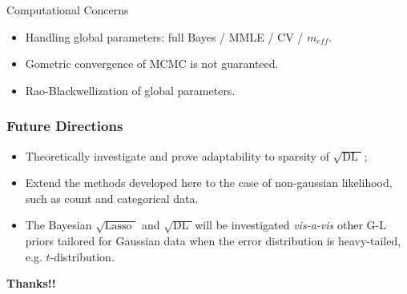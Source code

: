 \documentclass[10pt]{beamer}
\theoremstyle{plain}
\def\heading#1{\begin{center} \Large\bf{\color{DarkBlue} #1}
\end{center} } %
\def\sql{$\sqrt{\text{Lasso }}$}
\def\sqdl{$\sqrt{\text{DL }}$}
\begin{document}
\begin{frame}{Computational Concerns}
\begin{itemize}
	\item Handling global parameters: full Bayes / MMLE / CV / $m_{eff}$.
	\item Gometric convergence of MCMC is not guaranteed.
	\item Rao-Blackwellization of global parameters.
\end{itemize}
	
\end{frame}

\begin{frame}
\frametitle{Future Directions}
\begin{itemize}
	\item Theoretically investigate and prove adaptability to sparsity of \sqdl;
	\item Extend the methods developed here to the case of non-gaussian likelihood, such as count and categorical data.
	\item The Bayesian \sql{} and \sqdl will be investigated \textit{vis-a-vis} other G-L priors tailored for Gaussian data when the error distribution is heavy-tailed, e.g. $t$-distribution.
\end{itemize}
\end{frame}

\begin{frame}{}
\heading{Thanks!!}
\end{frame}

\end{document}
